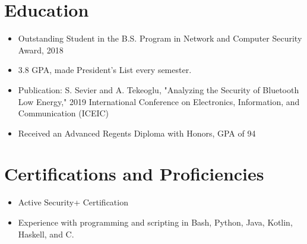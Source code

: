 \documentclass[11pt]{resume}
\begin{document}
\section{Education}
\begin{itemize}
\item Outstanding Student in the B.S. Program in Network and Computer Security Award, 2018
\item 3.8 GPA, made President's List every semester.
\item Publication: S. Sevier and A. Tekeoglu, "Analyzing the Security of Bluetooth Low Energy," 2019 International Conference on Electronics, Information, and Communication (ICEIC)
\end{itemize}




\begin{itemize}
\item Received an Advanced Regents Diploma with Honors, GPA of 94
\end{itemize}


\section{Certifications and Proficiencies}
\begin{itemize}
\item Active Security+ Certification
\item Experience with programming and scripting in Bash, Python, Java, Kotlin, Haskell, and C.
\end{itemize}
\end{document}
